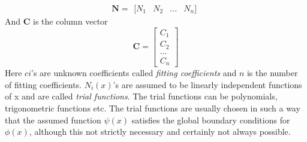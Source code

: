 \begin{equation}
\boldsymbol{N}=
\begin{matrix}
[ N_1	& N_2 & ... & N_n ]
\end{matrix}
\end{equation}
And \textbf{C} is the column vector 
\begin{equation}
\boldsymbol{C}=\left[
\begin{matrix}
C _1	\\ C_2 \\ ... \\ C_n 
\end{matrix} \right]
\end{equation}
Here $ci$’s are unknown coefficients called\textit{ fitting coefficients} and $n$ is the number of fitting coefficients. $N_i(x)$’s are assumed to be linearly independent functions of x and are called \textit{trial functions}.
The trial functions can be polynomials, trigonometric functions etc. The trial functions are usually chosen in such a way that the assumed function $\psi(x)$ satisfies the global boundary conditions for $\phi (x)$, although this not strictly necessary and certainly not always possible.

